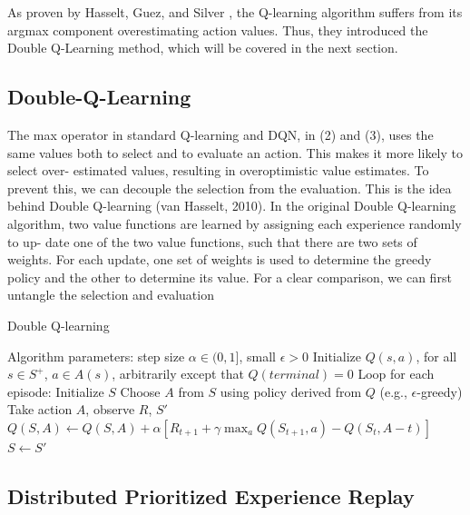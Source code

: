 \documentclass[12pt,a4paper]{article}
\begin{document}
As proven by Hasselt, Guez, and Silver \cite{VanHasselt2015}, the Q-learning algorithm suffers from its argmax component overestimating action values. Thus, they introduced the Double Q-Learning method, which will be covered in the next section.
\subsection{Double-Q-Learning}\label{double_q_learning}
The max operator in standard Q-learning and DQN, in (2) and (3), uses the same values both to select and to evaluate an action. This makes it more likely to select over- estimated values, resulting in overoptimistic value estimates. To prevent this, we can decouple the selection from the evaluation. This is the idea behind Double Q-learning (van Hasselt, 2010). In the original Double Q-learning algorithm, two value functions are learned by assigning each experience randomly to up- date one of the two value functions, such that there are two sets of weights. For each update, one set of weights is used to determine the greedy policy and the other to determine its value. For a clear comparison, we can first untangle the selection and evaluation
\begin{algorithm}
    \caption{Double Q-learning}
    \begin{algorithmic}
    \State Algorithm parameters: step size $\alpha \in (0, 1]$, small  $\epsilon > 0$
    \State Initialize $Q(s,a)$, for all $s\in S^+$, $a\in A(s)$, arbitrarily except that $Q(terminal)=0$
    \State Loop for each episode:
        \State Initialize $S$
            \State Choose $A$ from $S$ using policy derived from $Q$ (e.g., $\epsilon$-greedy)
            \State Take action $A$, observe $R$, $S'$
            \State $Q(S, A) \leftarrow Q(S, A) + \alpha [R_{t+1}+\gamma \max_aQ(S_{t+1},a)-Q(S_t,A-t)]$
            \State $S \leftarrow S'$
        \EndFor
    \EndWhile
    \end{algorithmic}
\end{algorithm}
\subsection{Distributed Prioritized Experience Replay}
\end{document}

